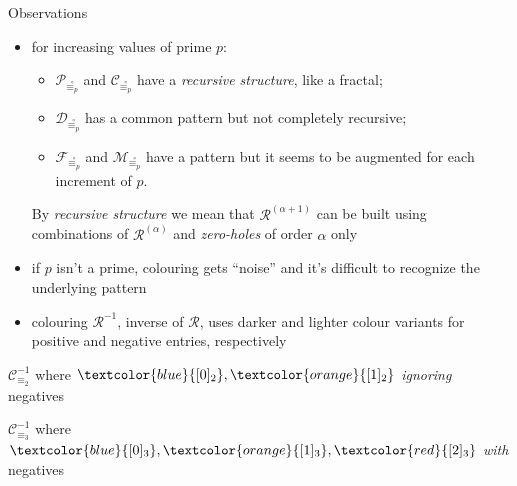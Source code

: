 \documentclass[10pt,serif, professionalfont]{beamer}
\begin{document}
\begin{frame}{Observations}
    \begin{itemize}
        \item for increasing values of prime $p$:
        \begin{itemize} 
            \item $\mathcal{P}_{\stackrel{\circ}{\equiv_{p}}}$ and
                $\mathcal{C}_{\stackrel{\circ}{\equiv_{p}}}$ have a \emph{recursive structure}, 
                like a fractal;
            \item $\mathcal{D}_{\stackrel{\circ}{\equiv_{p}}}$ has a common pattern but
                not completely recursive;
            \item $\mathcal{F}_{\stackrel{\circ}{\equiv_{p}}}$ and
                $\mathcal{M}_{\stackrel{\circ}{\equiv_{p}}}$ have a pattern but it seems
                to be augmented for each increment of $p$. 
        \end{itemize} 
        By \emph{recursive structure} we mean that $\mathcal{R}^{(\alpha+1)}$ can
        be built using combinations of  $\mathcal{R}^{(\alpha)}$ and \emph{zero-holes}
        of order $\alpha$ only

        \pause
        \item if $p$ isn't a prime, colouring gets ``noise'' and it's difficult
        to recognize the underlying pattern


        \pause
        \item colouring $\mathcal{R}^{-1}$, inverse of $\mathcal{R}$, uses darker
        and lighter colour variants for positive and negative entries, respectively
    \end{itemize} 
\end{frame}

\begin{frame}{$\mathcal{C}_{\equiv_{2}}^{-1}$ where 
    $\textcolor{blue}{[0]_{2}},\textcolor{orange}{[1]_{2}}$ \emph{ignoring} negatives}

    
\end{frame}

\begin{frame}{$\mathcal{C}_{\equiv_{3}}^{-1}$ where 
    $\textcolor{blue}{[0]_{3}},\textcolor{orange}{[1]_{3}},\textcolor{red}{[2]_{3}}$ \emph{with} negatives}

    
\end{frame}
\end{document}
